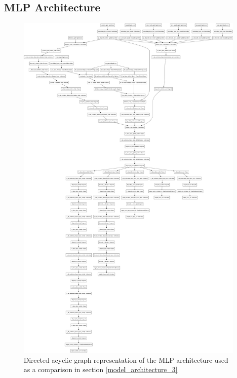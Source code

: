 \subsection{MLP Architecture}
\begin{figure}[H]
\centering
\includegraphics[width=\textwidth,height=0.8\textheight,keepaspectratio]{images/appendix_B/mlp_3.png}
\caption[\textbf{MLP DAG - Section \ref{model_architecture_3}}]{Directed acyclic graph representation of the MLP architecture used as a comparison in section \ref{model_architecture_3}}
\label{mlp_3_dag}
\end{figure}


